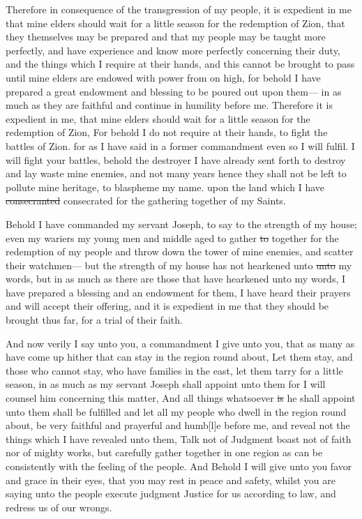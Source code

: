 					Therefore in consequence of the transgression of my people, it is expedient in me that mine elders should wait for a little season for the redemption of Zion, that they themselves may be prepared and that my people may be taught more perfectly, and have experience and know more perfectly concerning their duty, and the things which I require at their hands, and this cannot be brought to pass until mine elders are endowed with power from on high, for behold I have prepared a great endowment and blessing to be poured out upon them--- in as much as they are faithful and continue in humility before me. Therefore it is expedient in me, that mine elders should wait for a little season for the redemption of Zion, For behold I do not require at their hands, to fight the battles of Zion. for as I have said in a former commandment even so I will fulfil. I will fight your battles, behold the destroyer I have already sent forth to destroy and lay waste mine enemies, and not many years hence they shall not be left to pollute mine heritage, to blaspheme my name. upon the land which I have \sout{consecranted} consecrated for the gathering together of my Saints.
					
					Behold I have commanded my servant Joseph, to say to the strength of my house; even my wariers my young men and middle aged to gather \sout{to} together for the redemption of my people and throw down the tower of mine enemies, and scatter their watchmen--- but the strength of my house has not hearkened unto \sout{unto} my words, but in as much as there are those that have hearkened unto my words, I have prepared a blessing and an endowment for them, I have heard their prayers and will accept their offering, and it is expedient in me that they should be brought thus far, for a trial of their faith.
					
					And now verily I say unto you, a commandment I give unto you, that as many as have come up hither that can stay in the region round about, Let them stay, and those who cannot stay, who have families in the east, let them tarry for a little season, in as much as my servant Joseph shall appoint unto them for I will counsel him concerning this matter, And all things whatsoever \sout{is} he shall appoint unto them shall be fulfilled and let all my people who dwell in the region round about, be very faithful and prayerful and humb[l]e before me, and reveal not the things which I have revealed unto them, Talk not of Judgment boast not of faith nor of mighty works, but carefully gather together in one region as can be consistently with the feeling of the people. And Behold I will give unto you favor and grace in their eyes, that you may rest in peace and safety, whilst you are saying unto the people execute judgment Justice for us according to law, and redress us of our wrongs.
					
